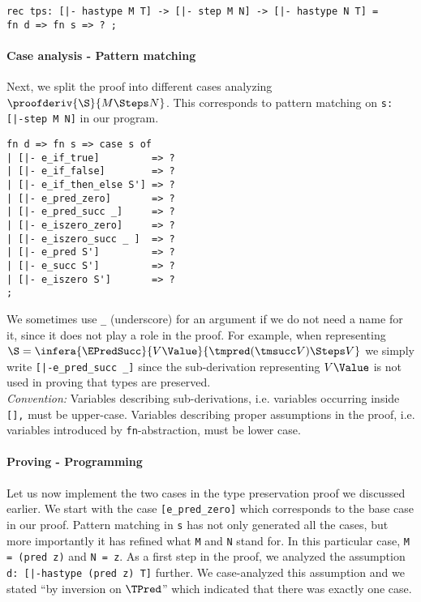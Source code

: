 \begin{lstlisting}
rec tps: [|- hastype M T] -> [|- step M N] -> [|- hastype N T] =
fn d => fn s => ? ;
\end{lstlisting}

\paragraph{Case analysis - Pattern matching} Next, we split the proof into
different cases analyzing $\proofderiv{\S}{M \Steps N}$. This corresponds to
pattern matching on \lstinline!s: [|-step M N]! in our program.

\begin{lstlisting}
fn d => fn s => case s of
| [|- e_if_true]         => ?
| [|- e_if_false]        => ?
| [|- e_if_then_else S'] => ?
| [|- e_pred_zero]       => ?
| [|- e_pred_succ _]     => ?
| [|- e_iszero_zero]     => ?
| [|- e_iszero_succ _ ]  => ?
| [|- e_pred S']         => ?
| [|- e_succ S']         => ?
| [|- e_iszero S']       => ?
;
\end{lstlisting}

We sometimes use \lstinline!_! (underscore) for an argument if we do not need a
name for it, since it does not play a role in the proof. For example, when
representing $\S = \infera{\EPredSucc}{V \Value}{\tmpred ({\tmsucc V}) \Steps V}$
we simply write \lstinline![|-e_pred_succ _]! since the sub-derivation
representing $V \Value$ is not used in proving that types are preserved.
\\[1em]
\emph{Convention:} Variables describing sub-derivations, i.e. variables
occurring inside \lstinline![],! must be upper-case. Variables describing
proper assumptions in the proof, i.e. variables introduced by
\lstinline!fn!-abstraction, must be lower case.

\paragraph{Proving - Programming} Let us now implement the two cases in the type
preservation proof we discussed earlier. We start with the case
\lstinline![e_pred_zero]! which corresponds to the base case in our proof.
Pattern matching in \lstinline!s! has not only generated all the cases, but more
importantly it has refined what \lstinline!M! and \lstinline!N! stand for. In
this particular case, \lstinline!M = (pred z)! and \lstinline!N = z!. As a first
step in the proof, we analyzed the assumption
\lstinline!d: [|-hastype (pred z) T]! further. We case-analyzed this assumption
and we stated ``by inversion on $\TPred$'' which indicated that there was
exactly one case.

